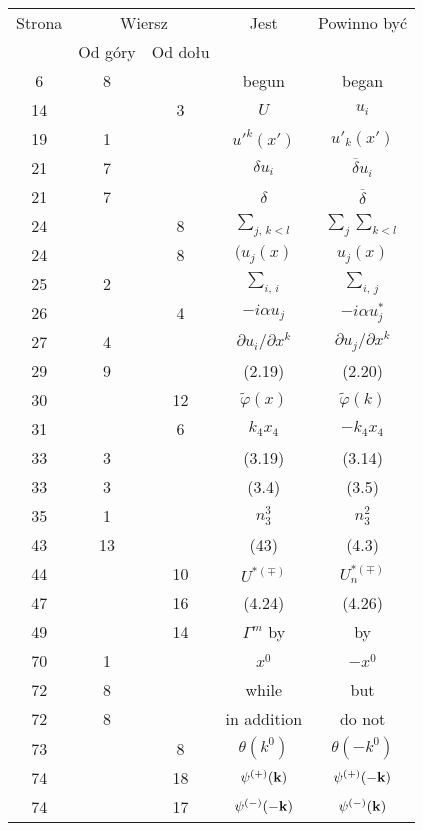 \documentclass[a4paper,11pt]{article}
\begin{document}
\begin{center}

  \begin{tabular}{|c|c|c|c|c|}
    \hline
    Strona & \multicolumn{2}{c|}{Wiersz} & Jest
                              & Powinno być \\ \cline{2-3}
    & Od góry & Od dołu & & \\
    \hline
    6 & 8 & & begun & began \\
    14 & & 3 & $U$ & $u_{ i }$ \\
    19 & 1 & & $u'^{ k }( x' )$ & $u'_{ k }( x' )$ \\
    21 & 7 & & $\delta u_{ i }$ & $\overline{ \delta } u_{ i }$ \\
    21 & 7 & & $\delta$ & $\overline{ \delta }$ \\
    24 & & 8 & $\sum\limits_{ j,\, k < l }$
           & $\sum\limits_{ j } \sum\limits_{ k < l }$ \\
    24 & & 8 & $( u_{ j }( x )$ & $u_{ j }( x )$ \\
    25 & 2 & & $\sum\limits_{ i,\, i }$ & $\sum\limits_{ i,\, j }$ \\
    26 & & 4 & $-i \alpha u_{ j }$ & $-i \alpha u_{ j }^{ * }$ \\
    27 & 4 & & $\partial u_{ i } / \partial x^{ k }$
           & $\partial u_{ j } / \partial x^{ k }$ \\
    29 & 9 & & (2.19) & (2.20) \\
    30 & & 12 & $\tilde{ \varphi }( x )$ & $\tilde{ \varphi }( k )$ \\
    31 & & 6 & $k_{ 4 } x_{ 4 }$ & $-k_{ 4 } x_{ 4 }$ \\
    33 & 3 & & (3.19) & (3.14) \\
    33 & 3 & & (3.4) & (3.5) \\
    35 & 1 & & $n_{ 3 }^{ 3 }$ & $n_{ 3 }^{ 2 }$ \\
    43 & 13 & & (43) & (4.3) \\
    44 & & 10 & $U^{ *( \mp ) }$ & $U_{ n }^{ *( \mp ) }$ \\
    47 & & 16 & (4.24) & (4.26) \\
    49 & & 14 & $\Gamma^{ m }$ by & by \\
    70 & 1 & & $x^{ 0 }$ & $-x^{ 0 }$ \\
    72 & 8 & & while & but \\
    72 & 8 & & in addition & do not \\
    73 & & 8 & $\theta( k^{ 0 } )$ & $\theta( -k^{ 0 } )$ \\
    74 & & 18 & $\psi^{ ( + ) }( \mathbf{k} )$
           & $\psi^{ ( + ) }( -\mathbf{k} )$ \\
    74 & & 17 & $\psi^{ ( - ) }( -\mathbf{k} )$
           & $\psi^{ ( - ) }( \mathbf{k} )$ \\
    \hline
  \end{tabular}


\end{center}
\end{document}
